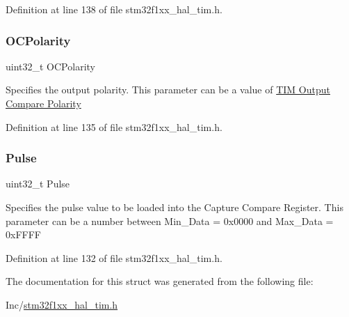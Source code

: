 Definition at line 138 of file stm32f1xx\+\_\+hal\+\_\+tim.\+h.

\mbox{\label{struct_t_i_m___one_pulse___init_type_def_a781c7dae9dec8b6c974b1bdf591b77e7}} 
\subsubsection{\texorpdfstring{O\+C\+Polarity}{OCPolarity}}
{\footnotesize\ttfamily uint32\+\_\+t O\+C\+Polarity}

Specifies the output polarity. This parameter can be a value of \hyperlink{group___t_i_m___output___compare___polarity}{T\+IM Output Compare Polarity} 

Definition at line 135 of file stm32f1xx\+\_\+hal\+\_\+tim.\+h.

\mbox{\label{struct_t_i_m___one_pulse___init_type_def_a5251c3bce4ca5baf013bc0ace0865a4c}} 
\subsubsection{\texorpdfstring{Pulse}{Pulse}}
{\footnotesize\ttfamily uint32\+\_\+t Pulse}

Specifies the pulse value to be loaded into the Capture Compare Register. This parameter can be a number between Min\+\_\+\+Data = 0x0000 and Max\+\_\+\+Data = 0x\+F\+F\+FF 

Definition at line 132 of file stm32f1xx\+\_\+hal\+\_\+tim.\+h.



The documentation for this struct was generated from the following file\+:\begin{DoxyCompactItemize}
\item 
Inc/\hyperlink{stm32f1xx__hal__tim_8h}{stm32f1xx\+\_\+hal\+\_\+tim.\+h}\end{DoxyCompactItemize}
